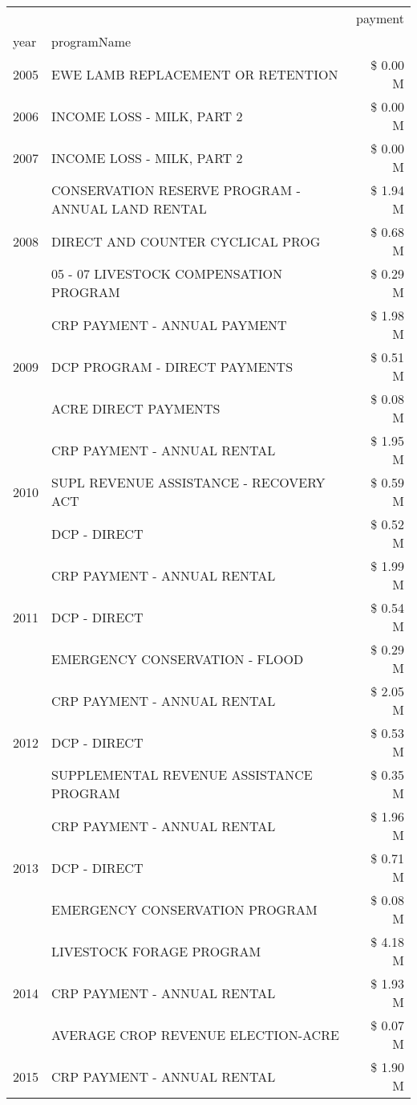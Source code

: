 \begin{tabular}{llr}
\toprule
 &  & payment \\
year & programName &  \\
\midrule
2005 & EWE LAMB REPLACEMENT OR RETENTION & \$ 0.00 M \\
\cline{1-3}
2006 & INCOME LOSS - MILK, PART 2 & \$ 0.00 M \\
\cline{1-3}
2007 & INCOME LOSS - MILK, PART 2 & \$ 0.00 M \\
\cline{1-3}
\multirow[t]{3}{*}{2008} & CONSERVATION RESERVE PROGRAM - ANNUAL LAND RENTAL & \$ 1.94 M \\
 & DIRECT AND COUNTER CYCLICAL PROG & \$ 0.68 M \\
 & 05 - 07 LIVESTOCK COMPENSATION PROGRAM & \$ 0.29 M \\
\cline{1-3}
\multirow[t]{3}{*}{2009} & CRP PAYMENT - ANNUAL PAYMENT & \$ 1.98 M \\
 & DCP PROGRAM - DIRECT PAYMENTS & \$ 0.51 M \\
 & ACRE DIRECT PAYMENTS & \$ 0.08 M \\
\cline{1-3}
\multirow[t]{3}{*}{2010} & CRP PAYMENT - ANNUAL RENTAL & \$ 1.95 M \\
 & SUPL REVENUE ASSISTANCE - RECOVERY ACT & \$ 0.59 M \\
 & DCP - DIRECT & \$ 0.52 M \\
\cline{1-3}
\multirow[t]{3}{*}{2011} & CRP PAYMENT - ANNUAL RENTAL & \$ 1.99 M \\
 & DCP - DIRECT & \$ 0.54 M \\
 & EMERGENCY CONSERVATION - FLOOD & \$ 0.29 M \\
\cline{1-3}
\multirow[t]{3}{*}{2012} & CRP PAYMENT - ANNUAL RENTAL & \$ 2.05 M \\
 & DCP - DIRECT & \$ 0.53 M \\
 & SUPPLEMENTAL REVENUE ASSISTANCE PROGRAM & \$ 0.35 M \\
\cline{1-3}
\multirow[t]{3}{*}{2013} & CRP PAYMENT - ANNUAL RENTAL & \$ 1.96 M \\
 & DCP - DIRECT & \$ 0.71 M \\
 & EMERGENCY CONSERVATION PROGRAM & \$ 0.08 M \\
\cline{1-3}
\multirow[t]{3}{*}{2014} & LIVESTOCK FORAGE PROGRAM & \$ 4.18 M \\
 & CRP PAYMENT - ANNUAL RENTAL & \$ 1.93 M \\
 & AVERAGE CROP REVENUE ELECTION-ACRE & \$ 0.07 M \\
\cline{1-3}
\multirow[t]{3}{*}{2015} & CRP PAYMENT - ANNUAL RENTAL & \$ 1.90 M \\

\end{tabular}
